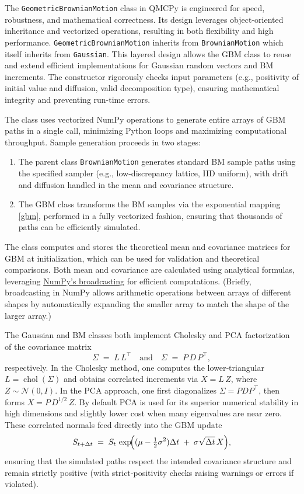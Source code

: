 The \texttt{GeometricBrownianMotion} class in QMCPy is engineered for speed,
robustness, and mathematical correctness. Its design leverages object-oriented
inheritance and vectorized operations, resulting in both flexibility and high
performance. \texttt{GeometricBrownianMotion} inherits from
\texttt{BrownianMotion} which itself inherits from \texttt{Gaussian}. This
layered design allows the GBM class to reuse and extend efficient
implementations for Gaussian random vectors and BM increments. The constructor
rigorously checks input parameters (e.g., positivity of initial value and
diffusion, valid decomposition type), ensuring mathematical integrity and
preventing run-time errors.

The class uses vectorized NumPy operations to generate entire arrays of GBM
paths in a single call, minimizing Python loops and maximizing computational
throughput. Sample generation proceeds in two stages:
\begin{enumerate}
\item 
The parent class \texttt{BrownianMotion} generates standard BM sample paths
using the specified sampler (e.g., low-discrepancy lattice, IID uniform), with
drift and diffusion handled in the mean and covariance structure.
\item  The GBM class transforms the BM samples via the exponential mapping
\eqref{gbm}, performed in a fully vectorized fashion, ensuring that thousands of
paths can be efficiently simulated.
\end{enumerate}
The class computes and stores the theoretical mean and covariance matrices for
GBM at initialization, which can be used for validation and theoretical
comparisons. Both mean and covariance are calculated using analytical formulas,
leveraging \href{https:/numpy.org/devdocs/user/basics.broadcasting.html}{NumPy’s
broadcasting} for efficient computations. (Briefly, broadcasting in NumPy allows
arithmetic operations between arrays of different shapes by automatically
expanding the smaller array to match the shape of the larger array.)

 The Gaussian and BM classes both implement Cholesky and PCA factorization of
 the covariance matrix
\[
\Sigma \;=\; L\,L^{\!\top}
\quad\text{and}\quad
\Sigma \;=\; P\,D\,P^{\!\top},
\]
respectively.  In the Cholesky method, one computes the lower‐triangular
$L=\operatorname{chol}(\Sigma)$ and obtains correlated increments via $X=L\,Z$,
where $Z\sim\mathcal{N}(0,I)$.  In the PCA approach, one first diagonalizes
$\Sigma=PDP^{\!\top}$, then forms $X = P\,D^{1/2}\,Z$.  By default PCA is used
for its superior numerical stability in high dimensions and slightly lower cost
when many eigenvalues are near zero.  These correlated normals feed directly
into the GBM update
\[
S_{t+\Delta t} \;=\; S_t\,\exp\!\Bigl((\mu - \tfrac12\sigma^2)\Delta t \;+\;\sigma\sqrt{\Delta t}\,X\Bigr),
\]
ensuring that the simulated paths respect the intended covariance structure and
remain strictly positive (with strict‐positivity checks raising warnings or
errors if violated).

